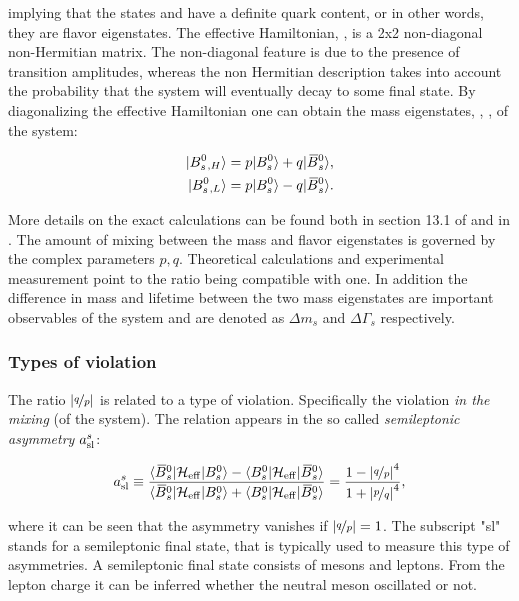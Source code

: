 \noindent implying that the states \Bs and \Bsb have a definite quark content, or in other words,
they are flavor eigenstates. The effective Hamiltonian, \Heff, is a 2x2 non-diagonal non-Hermitian matrix.
The non-diagonal feature is due to the presence of \BBbarSyst transition amplitudes,
whereas the non Hermitian description takes into account the probability that the system will
eventually decay to some final state. By diagonalizing the effective Hamiltonian one can obtain
the mass eigenstates, , , of the system:

\begin{align}
  \centering
  \ket{\Bs{}_{,H}} &= p \ket{\Bs} + q \ket{\Bsb}, \nonumber \\
  \ket{\Bs{}_{,L}} &= p \ket{\Bs} - q \ket{\Bsb}.
  \label{bs_mass_eigen}
\end{align}

\noindent More details on the exact calculations can be found both in section 13.1
of \cite{PDG} and in \cite{jeroenThesis,DeBruyn-thesis}. The amount of mixing between the mass
and flavor eigenstates is governed by the complex parameters $p,q$.
Theoretical calculations \cite{Lenz:2011ti} and experimental measurement \cite{asl-paper} point to the ratio
\qoverp being compatible with one. In addition the difference in mass and lifetime between the two mass
eigenstates are important observables of the \BBbarSyst system and are denoted as $\Delta m_s$ and $\Delta\Gamma_s$ respectively.

\subsubsection{Types of \CP violation}
The ratio $|\nicefrac{q}{p}|$ is related to a type of \CP violation. Specifically the \CP violation {\it in the mixing} (of the \BBbarSyst system).
The relation appears in the so called {\it semileptonic asymmetry} $a_{\rm sl}^{s}$:

\begin{equation}
  \centering
  a_{\rm sl}^{s}  \equiv \frac{\bra{\Bsb}\Heff\ket{\Bs} - \bra{\Bs}\Heff\ket{\Bsb}} {\bra{\Bsb}\Heff\ket{\Bs} + \bra{\Bs}\Heff\ket{\Bsb}}
                       = \frac{1 - \left|\nicefrac{q}{p}\right|^4}{1 + \left|\nicefrac{p}{q}\right|^4},
  \label{acp_mixing}
\end{equation}

\noindent where it can be seen that the asymmetry vanishes if $|\nicefrac{q}{p}|= 1$. The subscript "sl" stands for a
semileptonic final state, that is typically used to measure this type of asymmetries. A semileptonic final state
consists of mesons and leptons. From the lepton charge it can be inferred whether the neutral meson oscillated or not.

